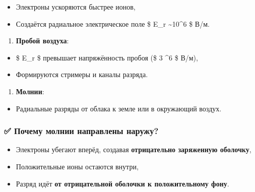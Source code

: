 \documentclass[11pt]{article}
\providecommand{\tightlist}{%
      \setlength{\itemsep}{0pt}\setlength{\parskip}{0pt}}
\begin{document}
\begin{itemize}
\tightlist
\item
  Электроны ускоряются быстрее ионов,\\
\item
  Создаётся радиальное электрическое поле \$ E\_r \sim 10\^{}6 \$ В/м.
\end{itemize}

\begin{enumerate}
\def\labelenumi{\arabic{enumi}.}
\setcounter{enumi}{1}
\tightlist
\item
  \textbf{Пробой воздуха}:\\
\end{enumerate}

\begin{itemize}
\tightlist
\item
  \$ E\_r \$ превышает напряжённость пробоя (\$ 3 \^{}6 \$
  В/м),\\
\item
  Формируются стримеры и каналы разряда.
\end{itemize}

\begin{enumerate}
\def\labelenumi{\arabic{enumi}.}
\setcounter{enumi}{2}
\tightlist
\item
  \textbf{Молнии}:\\
\end{enumerate}

\begin{itemize}
\tightlist
\item
  Радиальные разряды от облака к земле или в окружающий воздух.
\end{itemize}

\subsubsection{✅ Почему молнии направлены
наружу?}\label{ux43fux43eux447ux435ux43cux443-ux43cux43eux43bux43dux438ux438-ux43dux430ux43fux440ux430ux432ux43bux435ux43dux44b-ux43dux430ux440ux443ux436ux443}

\begin{itemize}
\tightlist
\item
  Электроны убегают вперёд, создавая \textbf{отрицательно заряженную
  оболочку},\\
\item
  Положительные ионы остаются внутри,\\
\item
  Разряд идёт \textbf{от отрицательной оболочки к положительному фону}.
\end{itemize}
\end{document}
